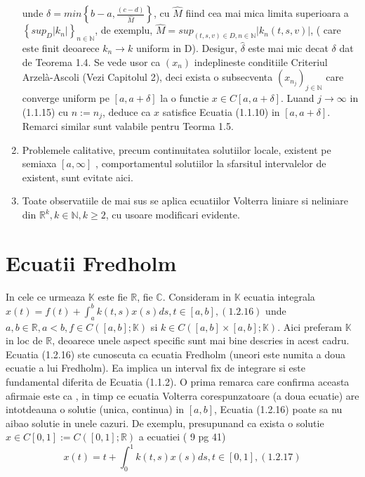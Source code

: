 \documentclass[a4paper,12pt,oneside]{report}
\begin{document}
\begin{enumerate}[1.]
unde \(\delta = min\left \{ b-a, \frac{\left ( c-d \right )}{\hat{M}} \right \}\), cu \(\hat{M}\) fiind cea mai mica limita superioara a \(\left \{ sup_{D} \left | k_{n} \right |\right \}_{n\in \mathbb{N}}\), de exemplu, \(\hat{M} = sup_{\left ( t,s,v \right )\in D, n \in \mathbb{N}}\left | k_{n}\left ( t,s,v \right ) \right |\), ( care este finit deoarece \(k_{n}\rightarrow k\) uniform in D). Desigur, \(\hat{\delta }\) este mai mic decat \({\delta }\) dat de Teorema 1.4. Se vede usor ca \(\left ( x_{n} \right )\)  indeplineste conditiile Criteriul Arzelà-Ascoli (Vezi Capitolul 2), deci exista o subsecventa \(\left ( x_{n_{j}} \right )_{j\in \mathbb{N}}\) care converge uniform pe \(\left [ a, a+ \delta  \right ]\) la o functie \(x \in C \left [ a, a+ \delta  \right ]\). Luand \(j\rightarrow \infty\) in (1.1.15) cu \(n:= n_{j}\), deduce ca \(x\) satisfice Ecuatia (1.1.10) in \(\left [ a,a+ \delta  \right ]\). Remarci similar sunt valabile pentru Teorma 1.5. 
\item Problemele calitative, precum continuitatea solutiilor locale, existent pe semiaxa \(\left [ a, \infty  \right ]\) , comportamentul solutiilor la sfarsitul intervalelor de existent, sunt evitate aici. 
\item Toate observatiile de mai sus se aplica ecuatiilor Volterra liniare si neliniare din \(\mathbb{R}^{k}, k\in \mathbb{N}, k\geq 2\), cu usoare modificari evidente. 
\end{enumerate}

\section{Ecuatii Fredholm}

In cele ce urmeaza \(\mathbb{K}\) este fie \(\mathbb{R}\), fie \(\mathbb{C}\). Consideram in \(\mathbb{K}\) ecuatia integrala \(x\left ( t \right ) = f\left ( t \right ) + \int_{a}^{b}k\left ( t,s \right )x\left ( s \right )ds, t\in \left [ a,b \right ], (1.2.16)\)
unde \(a,b \in \mathbb{R}, a< b, f\in C\left ( \left [ a,b \right ]; \mathbb{K}\right )\) si \(k\in C\left ( \left [ a,b \right ] \times \left [ a,b \right ]; \mathbb{K}\right ).\) Aici preferam \(\mathbb{K}\) in loc de \(\mathbb{R}\), deoarece unele aspect specific sunt mai bine descries in acest cadru. Ecuatia (1.2.16) ste cunoscuta ca ecuatia Fredholm (uneori este numita a doua ecuatie a lui Fredholm). Ea implica un interval fix de integrare si este fundamental diferita de Ecuatia (1.1.2).  O prima remarca care confirma aceasta afirmaie este ca , in timp ce ecuatia Volterra corespunzatoare (a doua ecuatie) are intotdeauna o solutie (unica, continua) in \(\left [ a,b \right ]\), Ecuatia (1.2.16) poate sa nu aibao solutie in unele cazuri. De exemplu, presupunand ca exista o solutie \(x \in C\left [ 0,1 \right ] := C\left ( \left [ 0,1 \right ]; \mathbb{R} \right )\) a ecuatiei ( 9 pg 41) 
\begin{displaymath}
  x\left ( t \right ) = t + \int_{0}^{1} k\left ( t,s \right )x\left ( s \right )ds, t\in \left [ 0,1 \right ], (1.2.17)
\end{displaymath}
\end{document}
